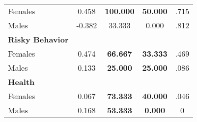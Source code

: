 \begin{tabular}{l c c c c}
\quad Females &      0.458 & \textbf{  100.000} & \textbf{   50.000} & .715 \\
\quad Males &     -0.382 &    33.333 &     0.000 & .812 \\
\midrule
\textbf{Risky Behavior} & & & & \\
\quad Females &      0.474 & \textbf{   66.667} & \textbf{   33.333} & .469 \\
\quad Males &      0.133 & \textbf{   25.000} & \textbf{   25.000} & .086 \\
\midrule
\textbf{Health} & & & & \\
\quad Females &      0.067 & \textbf{   73.333} & \textbf{   40.000} & .046 \\
\quad Males &      0.168 & \textbf{   53.333} & \textbf{    0.000} & 0 \\
\midrule
\bottomrule
\end{tabular}
